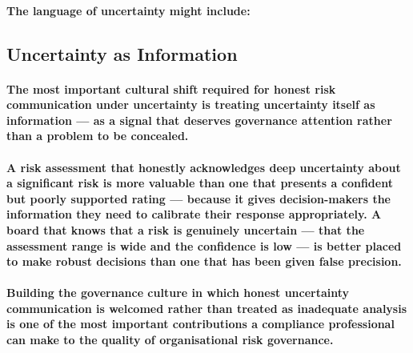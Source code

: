 \paragraph{The language of uncertainty might include:}
\begin{itemize}
\end{itemize}

\subsection{Uncertainty as Information}
\paragraph{The most important cultural shift required for honest risk communication under uncertainty is treating uncertainty itself as information — as a signal that deserves governance attention rather than a problem to be concealed.}
\paragraph{A risk assessment that honestly acknowledges deep uncertainty about a significant risk is more valuable than one that presents a confident but poorly supported rating — because it gives decision-makers the information they need to calibrate their response appropriately. A board that knows that a risk is genuinely uncertain — that the assessment range is wide and the confidence is low — is better placed to make robust decisions than one that has been given false precision.}
\paragraph{Building the governance culture in which honest uncertainty communication is welcomed rather than treated as inadequate analysis is one of the most important contributions a compliance professional can make to the quality of organisational risk governance.}

